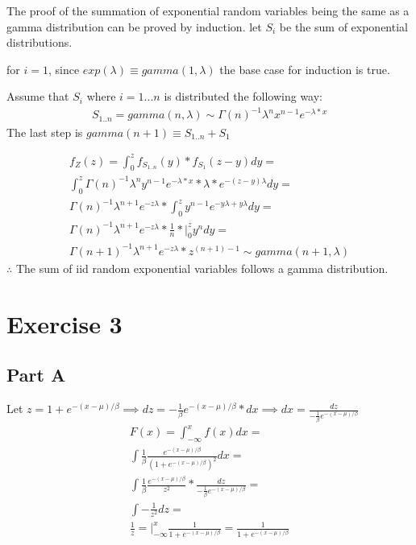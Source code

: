 \documentclass{article}\usepackage[]{graphicx}\usepackage[]{color}
\begin{document}
The proof of the summation of exponential random variables being the same as a gamma distribution can be proved by induction. let $S_{i}$ be the sum of exponential distributions.

for $i = 1$, since $exp(\lambda)\equiv gamma(1,\lambda)$ the base case for induction is true.  

Assume that $S_{i}$ where $i = 1...n$ is distributed the following way:
\begin{equation}
\begin{split}
S_{1..n} =  gamma(n,\lambda) \sim \Gamma(n)^{-1}\lambda^{n}x^{n-1}e^{-\lambda*x}
\end{split}
\end{equation}
The last step is $gamma(n+1) \equiv S_{1..n}+S_{1}$

\begin{equation}
\begin{split}
f_{Z}(z) = \int_{0}^{z}f_{S_{1..n}}(y)*f_{S_{1}}(z-y)dy = \\
\int_{0}^{z}\Gamma(n)^{-1}\lambda^{n}y^{n-1}e^{-\lambda*x}*\lambda*e^{-(z-y)\lambda}dy = \\
\Gamma(n)^{-1}\lambda^{n+1}e^{-z\lambda}*\int_{0}^{z}y^{n-1}e^{-y\lambda + y\lambda}dy = \\
\Gamma(n)^{-1}\lambda^{n+1}e^{-z\lambda}*\frac{1}{n}*\big|_{0}^{z}y^{n}dy = \\
\Gamma(n+1)^{-1}\lambda^{n+1}e^{-z\lambda}*z^{(n+1)-1} \sim gamma(n+1, \lambda)
\end{split}
\end{equation}
$\therefore$ The sum of iid random exponential variables follows a gamma distribution.
\section*{Exercise 3}
\subsection*{Part A}

Let $z = 1+e^{-(x-\mu)/\beta} \implies dz = -\frac{1}{\beta}e^{-(x-\mu)/\beta}*dx \implies dx = \frac{dz}{-\frac{1}{\beta}e^{-(x-\mu)/\beta}}$
\begin{equation}
\begin{split}
F(x) = \int^{x}_{-\infty} f(x) dx = \\
\int\frac{1}{\beta}\frac{e^{-(x-\mu)/\beta}}{(1+e^{-(x-\mu)/\beta})^2}dx= \\
\int\frac{1}{\beta}\frac{e^{-(x-\mu)/\beta}}{z^2}*\frac{dz}{-\frac{1}{\beta}e^{-(x-\mu)/\beta}}= \\
\int-\frac{1}{z^2}dz= \\
\frac{1}{z}=\big|^{x}_{-\infty}\frac{1}{1+e^{-(x-\mu)/\beta}}=\frac{1}{1+e^{-(x-\mu)/\beta}}
\end{split}
\end{equation}
\end{document}
